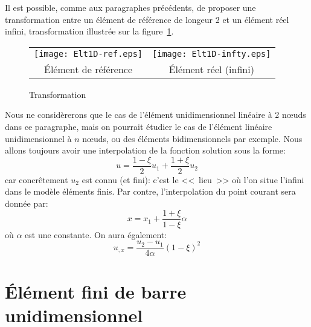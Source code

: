 Il est possible, comme aux paragraphes précédents, de proposer une transformation
entre un élément de référence de longeur 2 et un élément réel infini, transformation illustrée sur la figure~\ref{fig:ex2:trans}.
\begin{figure}[ht]\centering
\begin{tabular}{cc}
\texttt{[image: Elt1D-ref.eps]} &
\texttt{[image: Elt1D-infty.eps]} \\
Élément de référence & Élément réel (infini)
\end{tabular}\caption{Transformation}\label{fig:ex2:trans}
\end{figure}
\medskipvm
Nous ne considèrerons que le cas de l'élément unidimensionnel linéaire à 2 nœuds dans ce paragraphe, mais on pourrait étudier le cas de l'élément linéaire unidimensionnel à $n$ nœuds, ou des éléments bidimensionnels par exemple.
\medskipvm
Nous allons toujours avoir une interpolation de la fonction solution sous la forme:
\begin{equation} u =\frac{1-\xi}2 u_1 + \frac{1+\xi}2 u_2\end{equation}
car concrêtement $u_2$ est connu (et fini): c'est le <<~lieu~>> où l'on situe l'infini dans le
modèle éléments finis.
\medskipvm
Par contre, l'interpolation du point courant sera donnée par:
\begin{equation}
x=x_1+\frac{1+\xi}{1-\xi}\alpha
\end{equation}
où $\alpha$ est une constante.
\medskipvm
On aura également:
\begin{equation} u_{,x} = \frac{u_2-u_1}{4\alpha} (1-\xi)^2 \end{equation}
\medskipvm
\ifVersionAvecExemplesSepares
   \section{Élément fini de barre unidimensionnel}\label{Sec-barre1D}
\else
